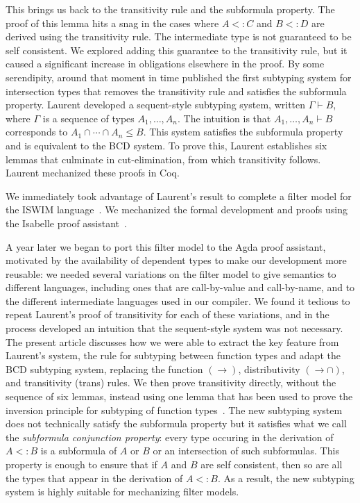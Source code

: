 \documentclass{article}
\begin{document}
This brings us back to the transitivity rule and the subformula
property. The proof of this lemma hits a snag in the cases where $A <:
C$ and $B <: D$ are derived using the transitivity rule. The
intermediate type is not guaranteed to be self consistent. We explored
adding this guarantee to the transitivity rule, but it caused a
significant increase in obligations elsewhere in the proof. By some
serendipity, around that moment in time \citet{Laurent:2018aa}
published the first subtyping system for intersection types that
removes the transitivity rule and satisfies the subformula property.
Laurent developed a sequent-style subtyping system, written $\Gamma
\vdash B$, where $\Gamma$ is a sequence of types $A_1,\ldots,A_n$. The
intuition is that $A_1,\ldots,A_n \vdash B$ corresponds to $A_1 \cap
\cdots \cap A_n \leq B$. This system satisfies the subformula property
and is equivalent to the BCD system. To prove this, Laurent
establishes six lemmas that culminate in cut-elimination, from which
transitivity follows. Laurent mechanized these proofs in Coq.

We immediately took advantage of Laurent's result to complete a filter
model for the ISWIM
language~\citep{Landin:1966la,G.-D.-Plotkin:1975on,Felleisen:2009aa}.
We mechanized the formal development and proofs using the Isabelle
proof assistant~\citep{Siek:2018aa}.

A year later we began to port this filter model to the Agda proof
assistant, motivated by the availability of dependent types to make
our development more reusable: we needed several variations on the
filter model to give semantics to different languages, including ones
that are call-by-value and call-by-name, and to the different
intermediate languages used in our compiler. We found it tedious to
repeat Laurent's proof of transitivity for each of these variations,
and in the process developed an intuition that the sequent-style
system was not necessary. The present article discusses how we were
able to extract the key feature from Laurent's system, the rule for
subtyping between function types and adapt the BCD subtyping system,
replacing the function $(\to)$, distributivity $({\to}{\cap})$, and
transitivity (trans) rules.  We then prove transitivity directly,
without the sequence of six lemmas, instead using one lemma that has
been used to prove the inversion principle for subtyping of function
types~\citep{Barendregt:2013aa}. The new subtyping system does not
technically satisfy the subformula property but it satisfies what we
call the \emph{subformula conjunction property}: every type occuring
in the derivation of $A <: B$ is a subformula of $A$ or $B$ or an
intersection of such subformulas.  This property is enough to ensure
that if $A$ and $B$ are self consistent, then so are all the types
that appear in the derivation of $A <: B$. As a result, the new
subtyping system is highly suitable for mechanizing filter models.
\end{document}
